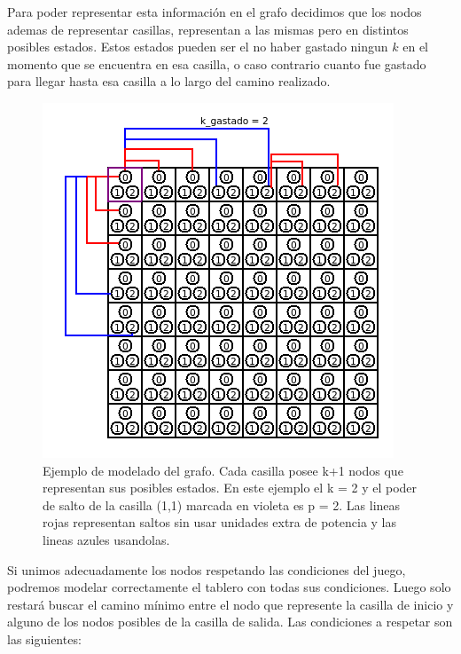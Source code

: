 Para poder representar esta informaci\'on en el grafo decidimos que los nodos ademas de representar casillas, representan a las mismas pero en distintos posibles estados. Estos estados pueden ser el no haber gastado ningun $k$ en el momento que se encuentra en esa casilla, o caso contrario cuanto fue gastado para llegar hasta esa casilla a lo largo del camino realizado.

\begin{figure}[h]
\begin{center}
\includegraphics[scale=0.6]{./img/ej3_res1.png}
\caption{Ejemplo de modelado del grafo. Cada casilla posee k+1 nodos que representan sus posibles estados. En este ejemplo el k = 2 y el poder de salto de la casilla (1,1) marcada en violeta es p = 2. Las lineas rojas representan saltos sin usar unidades extra de potencia y las lineas azules usandolas.}
\end{center}
\end{figure}

Si unimos adecuadamente los nodos respetando las condiciones del juego, podremos modelar correctamente el tablero con todas sus condiciones. Luego solo restar\'a buscar el camino m\'inimo entre el nodo que represente la casilla de inicio y alguno de los nodos posibles de la casilla de salida. Las condiciones a respetar son las siguientes:

